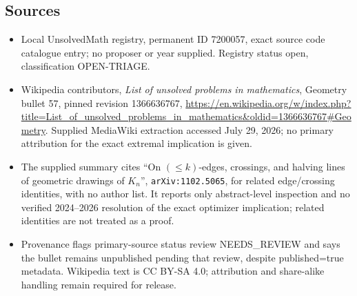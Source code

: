 \documentclass[11pt]{article}
\begin{document}
\subsection{Sources}
\begin{itemize}
\item Local UnsolvedMath registry, permanent ID 7200057, exact source code catalogue entry; no proposer or year supplied. Registry status open, classification OPEN-TRIAGE.
\item Wikipedia contributors, \emph{List of unsolved problems in mathematics}, Geometry bullet 57, pinned revision 1366636767, \url{https://en.wikipedia.org/w/index.php?title=List_of_unsolved_problems_in_mathematics&oldid=1366636767#Geometry}. Supplied MediaWiki extraction accessed July 29, 2026; no primary attribution for the exact extremal implication is given.
\item The supplied summary cites ``On $(\leq k)$-edges, crossings, and halving lines of geometric drawings of $K_n$'', \texttt{arXiv:1102.5065}, for related edge/crossing identities, with no author list. It reports only abstract-level inspection and no verified 2024--2026 resolution of the exact optimizer implication; related identities are not treated as a proof.
\item Provenance flags primary-source status review NEEDS\_REVIEW and says the bullet remains unpublished pending that review, despite published=true metadata. Wikipedia text is CC BY-SA 4.0; attribution and share-alike handling remain required for release.
\end{itemize}
\end{document}
